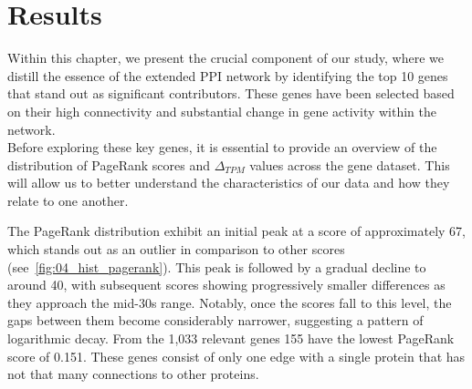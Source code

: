 \section{Results} \label{sec:results}
Within this chapter, we present the crucial component of our study,
where we distill the essence of the extended PPI network by identifying the top 10 genes that stand out as significant contributors.
These genes have been selected based on their high connectivity and substantial change in gene activity within the network.\\

Before exploring these key genes,
it is essential to provide an overview of the distribution of PageRank scores and $\Delta_{TPM}$ values across the gene dataset.
This will allow us to better understand the characteristics of our data and how they relate to one another.

The PageRank distribution exhibit an initial peak at a score of approximately 67,
which stands out as an outlier in comparison to other scores (see~\cref{fig:04_hist_pagerank}).
This peak is followed by a gradual decline to around 40, with subsequent scores showing progressively smaller differences
as they approach the mid-30s range.
Notably, once the scores fall to this level, the gaps between them become considerably narrower,
suggesting a pattern of logarithmic decay.
From the 1,033 relevant genes 155 have the lowest PageRank score of 0.151.
These genes consist of only one edge with a single protein that has not that many connections to other proteins.\\

